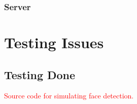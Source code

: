 \documentclass[11pt,a4paper,titlepage]{report}
\begin{document}
\subsubsection{Server}






%
%
%
%



\section{Testing Issues}
\subsection{Testing Done}

\textcolor{red}{Source code for simulating face detection.}
\end{document}
